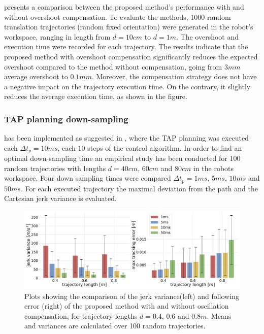  presents a comparison between the proposed method's performance with and without overshoot compensation. To evaluate the methods, 1000 random translation trajectories (random fixed orientation) were generated in the robot's workspace, ranging in length from $d\!=\!10cm$ to $d\!=\!1m$. The overshoot and execution time were recorded for each trajectory. The results indicate that the proposed method with overshoot compensation significantly reduces the expected overshoot compared to the method without compensation, going from $3mm$ average overshoot to $0.1mm$. Moreover, the compensation strategy does not have a negative impact on the trajectory execution time. On the contrary, it slightly reduces the average execution time, as shown in the figure.


\subsubsection{TAP planning down-sampling} has been implemented as suggested in , where the TAP planning was executed each $\Delta t_{p}\!=\!10ms$, each $10$ steps of the control algorithm. In order to find an optimal down-sampling time an empirical study has been conducted for 100 random trajectories with lengths $d=40cm$, $60cm$ and $80cm$ in the robots workspace. Four down sampling times were compared $\Delta t_p =1ms$, $5ms$, $10ms$ and $50ms$. For each executed trajectory the maximal deviation from the path and the Cartesian jerk variance is evaluated. 
\begin{figure}[!t]
    \centering
    \includegraphics[width=\linewidth]{Papers/imgs/compensation_comp_oscillations.pdf}
    \caption{Plots showing the comparison of the jerk variance(left) and following error (right) of the proposed method with and without oscillation compensation, for trajectory lengths $d=0.4$, $0.6$ and $0.8m$. Means and variances are calculated over 100 random trajectories. }
    \label{fig:compensatiopn_comp_oscillations}
\end{figure}

